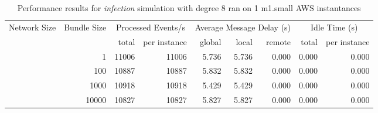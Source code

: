 \begin{table}
	  \caption[Performance results, \emph{infection:8 on 1 m1.small instances }]{ Performance results for \emph{ infection } simulation with degree 8 ran on 1 m1.small AWS instantances }
	\begin{tabular}{rrrrrrrrr}
	\hline\noalign{\smallskip}

	Network Size &
	Bundle Size &
	\multicolumn{2}{c}{Processed Events/s} & 
	\multicolumn{3}{c}{Average Message Delay (s)} & 
	\multicolumn{2}{c}{Idle Time (s)}  \\

	 & 
	 & 
	 total & per instance
     & global & local & remote
     & total & per instance\\

			
				\noalign{\smallskip}\hline
				\multirow{ 4 }{*}{ 40000 } &
				
					
					 
					\multirow{ 1 }{*}{ 1 } &
					
						
							    
							     11006  & 11006  
	                           & 5.736 & 5.736 & 0.000
	                           & 0.000 & 0.000  \\
	                
	            
					 &  
					 
					\multirow{ 1 }{*}{ 100 } &
					
						
							    
							     10887  & 10887  
	                           & 5.832 & 5.832 & 0.000
	                           & 0.000 & 0.000  \\
	                
	            
					 &  
					 
					\multirow{ 1 }{*}{ 1000 } &
					
						
							    
							     10918  & 10918  
	                           & 5.429 & 5.429 & 0.000
	                           & 0.000 & 0.000  \\
	                
	            
					 &  
					 
					\multirow{ 1 }{*}{ 10000 } &
					
						
							    
							     10827  & 10827  
	                           & 5.827 & 5.827 & 0.000
	                           & 0.000 & 0.000  \\
	                

\end{tabular}
\end{table}
